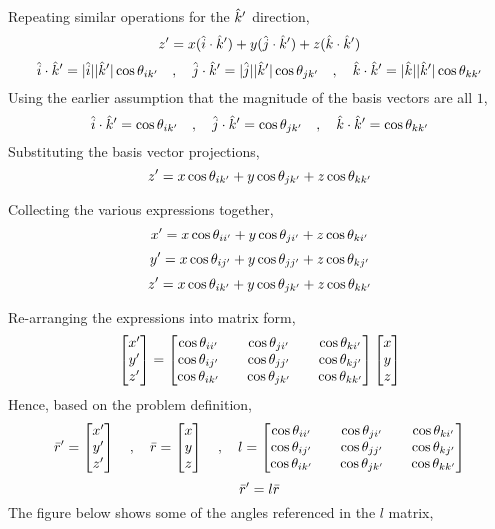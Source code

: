 \documentclass[class=report, 12pt, crop=false]{standalone}
\begin{document}
\begin{center}
Repeating similar operations for the $\hat{k}'$ direction,
$$z' = x(\hat{i}\cdot\hat{k}') + y(\hat{j}\cdot\hat{k}') + z(\hat{k}\cdot\hat{k}')$$
$$\hat{i}\cdot\hat{k}' = |\hat{i}||\hat{k}'|\cos\theta_{ik'} \quad,\quad \hat{j}\cdot\hat{k}' = |\hat{j}||\hat{k}'|\cos\theta_{jk'} \quad,\quad \hat{k}\cdot\hat{k}' = |\hat{k}||\hat{k}'|\cos\theta_{kk'}$$
Using the earlier assumption that the magnitude of the basis vectors are all $1$,
$$\hat{i}\cdot\hat{k}' = \cos\theta_{ik'} \quad,\quad \hat{j}\cdot\hat{k}' = \cos\theta_{jk'} \quad,\quad \hat{k}\cdot\hat{k}' = \cos\theta_{kk'}$$
Substituting the basis vector projections,
$$z' = x\cos\theta_{ik'} + y\cos\theta_{jk'} + z\cos\theta_{kk'}$$

Collecting the various expressions together,
$$x' = x\cos\theta_{ii'} + y\cos\theta_{ji'} + z\cos\theta_{ki'}$$
$$y' = x\cos\theta_{ij'} + y\cos\theta_{jj'} + z\cos\theta_{kj'}$$
$$z' = x\cos\theta_{ik'} + y\cos\theta_{jk'} + z\cos\theta_{kk'}$$

Re-arranging the expressions into matrix form,
$$\begin{bmatrix}
x' \\ y' \\ z'
\end{bmatrix} = \begin{bmatrix}
\cos\theta_{ii'} && \cos\theta_{ji'} && \cos\theta_{ki'} \\
\cos\theta_{ij'} && \cos\theta_{jj'} && \cos\theta_{kj'} \\
\cos\theta_{ik'} && \cos\theta_{jk'} && \cos\theta_{kk'}
\end{bmatrix}\begin{bmatrix}
x \\ y \\ z
\end{bmatrix}$$
Hence, based on the problem definition,
$$\bar{r}' = \begin{bmatrix}
x' \\ y' \\ z'
\end{bmatrix} \quad,\quad \bar{r} = \begin{bmatrix}
x \\ y \\ z
\end{bmatrix} \quad,\quad l = \begin{bmatrix}
\cos\theta_{ii'} && \cos\theta_{ji'} && \cos\theta_{ki'} \\
\cos\theta_{ij'} && \cos\theta_{jj'} && \cos\theta_{kj'} \\
\cos\theta_{ik'} && \cos\theta_{jk'} && \cos\theta_{kk'}
\end{bmatrix}$$
$$\bar{r}' = l \bar{r}$$
The figure below shows some of the angles referenced in the $l$ matrix,
\end{center}
\end{document}
